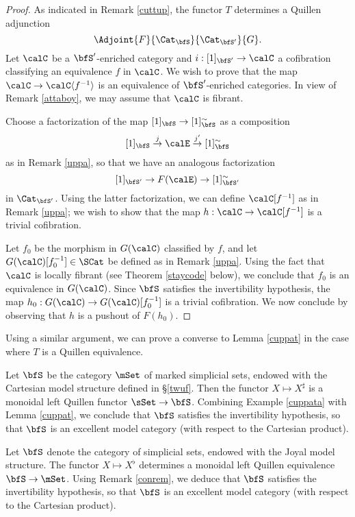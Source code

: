 \begin{Simplicial Categories}
\begin{proof}
As indicated in Remark \ref{cuttup}, the functor $T$ determines a Quillen adjunction
$$ \Adjoint{F}{\Cat_{\bfS}}{\Cat_{\bfS'}}{G}.$$
Let $\calC$ be a $\bfS'$-enriched category and $i: [1]_{\bfS'} \rightarrow \calC$
a cofibration classifying an equivalence $f$ in $\calC$. We wish to prove that the
map $\calC \rightarrow \calC \langle f^{-1} \rangle$ is an equivalence of
$\bfS'$-enriched categories. In view of Remark \ref{attaboy}, we may assume
that $\calC$ is fibrant.

Choose a factorization of the map $[1]_{\bfS} \rightarrow [1]_{\bfS}^{\sim}$
as a composition
$$ [1]_{\bfS} \stackrel{j}{\rightarrow} \calE \stackrel{j'}{\rightarrow} [1]_{\bfS}^{\sim}$$
as in Remark \ref{uppa}, so that we have an analogous factorization
$$ [1]_{\bfS'} \rightarrow F(\calE) \rightarrow [1]_{\bfS'}^{\sim}$$
in $\Cat_{\bfS'}$. Using the latter factorization, we can define
$\calC[ f^{-1}]$ as in Remark \ref{uppa}; we wish to show that the map
$h: \calC \rightarrow \calC[f^{-1}]$ is a trivial cofibration. 

Let $f_0$ be the morphism in $G(\calC)$ classified by $f$, and
let $G(\calC)[f_0^{-1}] \in \SCat$ be defined as in Remark \ref{uppa}. 
Using the fact that $\calC$ is locally fibrant (see Theorem \ref{staycode} below),
we conclude that $f_0$ is an equivalence in $G(\calC)$. Since $\bfS$
satisfies the invertibility hypothesis, the map
$h_0: G(\calC) \rightarrow G(\calC)[f_0^{-1}]$ is a trivial cofibration.
We now conclude by observing that $h$ is a pushout of $F(h_0)$.
\end{proof}

\begin{remark}\label{conrem}
Using a similar argument, we can prove a converse to Lemma \ref{cuppat} in the case where
$T$ is a Quillen equivalence.
\end{remark}

\begin{example}\label{supermat}
Let $\bfS$ be the category $\mSet$ of marked simplicial sets, endowed with
the Cartesian model structure defined in \S \ref{twuf}. Then the functor
$X \mapsto X^{\sharp}$ is a monoidal left Quillen functor 
$\sSet \rightarrow \bfS$. Combining Example \ref{cuppata} with Lemma \ref{cuppat}, we
conclude that $\bfS$ satisfies the invertibility hypothesis, so that $\bfS$ is an excellent model category (with respect to the Cartesian product).
\end{example}

\begin{example}
Let $\bfS$ denote the category of simplicial sets, endowed with the Joyal model structure.
The functor $X \mapsto X^{\flat}$ determines a monoidal left Quillen equivalence
$\bfS \rightarrow \mSet$. Using Remark \ref{conrem}, we deduce that $\bfS$ satisfies the invertibility hypothesis, so that $\bfS$ is an excellent model category (with respect to the Cartesian product).
\end{example}


\end{Simplicial Categories}
